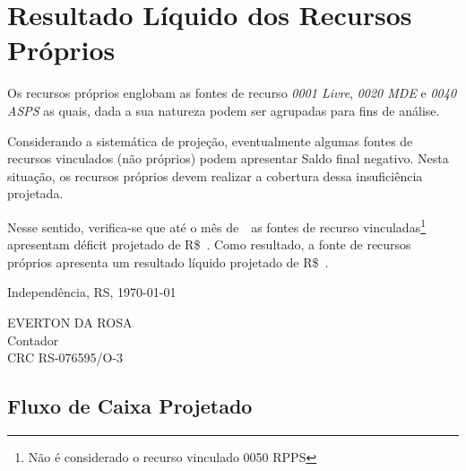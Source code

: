 \documentclass[12pt, a4paper]{report}
\begin{document}
\chapter*{Resultado Líquido dos Recursos Próprios} \label{ch:resultado_recursos_proprios}

Os recursos próprios englobam as fontes de recurso \textit{0001 Livre}, \textit{0020 MDE} e \textit{0040 ASPS} as quais, dada a sua natureza podem ser agrupadas para fins de análise.

Considerando a sistemática de projeção, eventualmente algumas fontes de recursos vinculados (não próprios) podem apresentar Saldo final negativo. Nesta situação, os recursos próprios devem realizar a cobertura dessa insuficiência projetada.

Nesse sentido, verifica-se que até o mês de~\thedate~as fontes de recurso vinculadas\footnote{Não é considerado o recurso vinculado 0050 RPPS} apresentam déficit projetado de R\$~. Como resultado, a fonte de recursos próprios apresenta um resultado líquido projetado de R\$~\resultadoProprio.



\vspace{16pt}

\begin{center}
	Independência, RS, \today
\end{center}

\vspace{36pt}

\begin{center}
	EVERTON DA ROSA\\
	Contador\\
	CRC RS-076595/O-3
\end{center}


\appendix

\begin{landscape}
\chapter*{Fluxo de Caixa Projetado} \label{app:fluxo_de_caixa}


\end{landscape}
\end{document}

